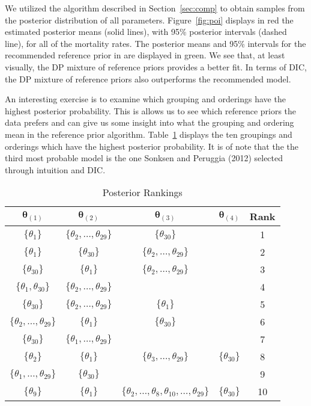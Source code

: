\documentclass[11pt,a4paper,notitlepage]{article}
\begin{document}
We utilized the algorithm described in Section~\ref{sec:comp} to
obtain samples from the posterior distribution of all parameters.
Figure~\ref{fig:poi} displays in red the estimated posterior means (solid
lines), with 95\% posterior intervals (dashed line), for all of the
mortality rates.  The posterior means and 95\% intervals for the
recommended reference prior in \cite{SonksenPeruggia2012} are
displayed in green.  We see that, at least visually, the DP mixture of
reference priors provides a better fit.  In terms of DIC, the DP
mixture of reference priors also outperforms the recommended model.

An interesting exercise is to examine which grouping and orderings have
the highest posterior probability.  This is allows us to see which
reference priors the data prefers and can give us some insight into
what the grouping and ordering mean in the reference prior algorithm.
Table~\ref{tab:poi_rank} displays the ten groupings and orderings which have
the highest posterior probability.  It is of note that the the third
most probable model is the one Sonksen and Peruggia (2012) selected
through intuition and DIC.

\begin{table}
\begin{center}
\begin{tabular}{c|c|c|c|c}
$\boldsymbol{\theta}_{(1)}$&$\boldsymbol{\theta}_{(2)}$&$\boldsymbol{\theta}_{(3)}$&$\boldsymbol{\theta}_{(4)}$ & Rank \\
\hline
 $\{\theta_{1}\}$& $\{\theta_{2},\ldots,\theta_{29}\}$&$\{\theta_{30}\}$  & &1\\
$\{\theta_{1}\}$& $\{\theta_{30}\}$& $\{\theta_{2},\ldots,\theta_{29}\}$ & &2\\
$\{\theta_{30}\}$& $\{\theta_{1}\}$& $\{\theta_{2},\ldots,\theta_{29}\}$ & &3\\
$\{\theta_{1}, \theta_{30}\}$&$\{\theta_{2},\ldots,\theta_{29}\}$& & &4\\
 $\{\theta_{30}\}$& $\{\theta_{2},\ldots,\theta_{29}\}$&$\{\theta_{1}\}$  & &5\\
  $\{\theta_{2},\ldots,\theta_{29}\}$&$\{\theta_{1}\}$&$\{\theta_{30}\}$  & &6\\
$\{\theta_{30}\}$&  $\{\theta_{1}, \ldots, \theta_{29}\}$ & & &7\\
$\{\theta_{2}\}$&$\{\theta_{1}\}$&  $\{\theta_{3}, \ldots, \theta_{29}\}$&$\{\theta_{30}\}$&8\\
$\{\theta_{1}, \ldots, \theta_{29}\}$&$\{\theta_{30}\}$& &&9\\
$\{\theta_{9}\}$&$\{\theta_{1}\}$&$\{\theta_{2}, \ldots, \theta_{8}, \theta_{10}, \ldots, \theta_{29}\}$&$\{\theta_{30}\}$& 10\\
\end{tabular}
\caption{Posterior Rankings}\label{tab:poi_rank}
\end{center}
\end{table}
\end{document}
